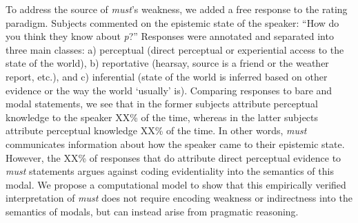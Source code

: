 \documentclass[12pt]{article}
\begin{document}
To address the source of \emph{must}'s weakness, we added a free response to the rating paradigm. Subjects commented on the epistemic state of the speaker: ``How do you think they know about \emph{p}?'' Responses were annotated and separated into three main classes: a) perceptual (direct perceptual or experiential access to the state of the world), b) reportative (hearsay, source is a friend or the weather report, etc.), and c) inferential (state of the world is inferred based on other evidence or the way the world `usually' is). Comparing responses to bare and modal statements, we see that in the former subjects attribute perceptual knowledge to the speaker XX\% of the time, whereas in the latter subjects attribute perceptual knowledge XX\% of the time. In other words, \emph{must} communicates information about how the speaker came to their epistemic state. However, the XX\% of responses that do attribute direct perceptual evidence to \emph{must} statements argues against coding evidentiality into the semantics of this modal. We propose a computational model to show that this empirically verified interpretation of \emph{must} does not require encoding weakness or indirectness into the semantics of modals, but can instead arise from pragmatic reasoning. 
\end{document}
